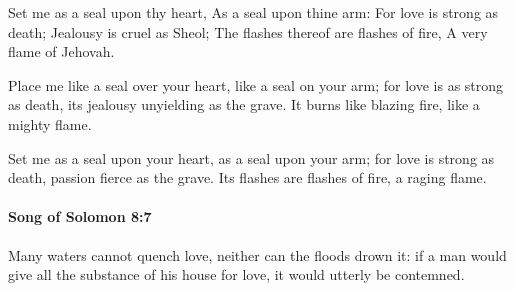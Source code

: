 			\begin{versebox}
					\item[BHS] 
					\item[LXX] 
					\item[ASV] Set me as a seal upon thy heart, As a seal upon thine arm: For love is strong as death; Jealousy is cruel as Sheol; The flashes thereof are flashes of fire, A very flame of Jehovah.
					\item[NIV] Place me like a seal over your heart, like a seal on your arm; for love is as strong as death, its jealousy unyielding as the grave. It burns like blazing fire, like a mighty flame.
					\item[NRSV] Set me as a seal upon your heart, as a seal upon your arm; for love is strong as death, passion fierce as the grave. Its flashes are flashes of fire, a raging flame.
			\end{versebox}

		\paragraph{Song of Solomon 8:7} %
			\label{SONGOFSOLOMON-8-7}

			Many waters cannot quench love, neither can the floods drown it: if a man would give all the substance of his house for love, it would utterly be contemned.

